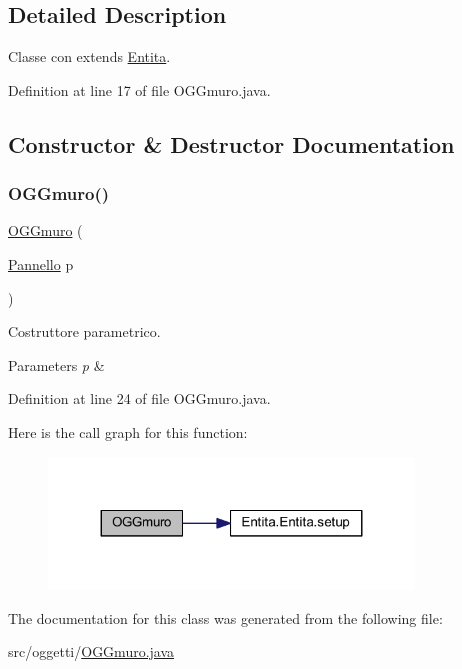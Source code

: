 \subsection{Detailed Description}
Classe con extends \hyperlink{namespace_entita}{Entita}. 

Definition at line 17 of file O\+G\+Gmuro.\+java.



\subsection{Constructor \& Destructor Documentation}
\mbox{\label{classoggetti_1_1_o_g_gmuro_a938d7b2801316b27b70a11b2728f6811}} 
\subsubsection{\texorpdfstring{O\+G\+Gmuro()}{OGGmuro()}}
{\footnotesize\ttfamily \hyperlink{classoggetti_1_1_o_g_gmuro}{O\+G\+Gmuro} (\begin{DoxyParamCaption}\item[{\hyperlink{classa_1_1survival_1_1game_1_1_pannello}{Pannello}}]{p }\end{DoxyParamCaption})}



Costruttore parametrico. 


\begin{DoxyParams}{Parameters}
{\em p} & \\
\hline
\end{DoxyParams}


Definition at line 24 of file O\+G\+Gmuro.\+java.

Here is the call graph for this function\+:
\nopagebreak
\begin{figure}[H]
\begin{center}
\leavevmode
\includegraphics[width=275pt]{classoggetti_1_1_o_g_gmuro_a938d7b2801316b27b70a11b2728f6811_cgraph}
\end{center}
\end{figure}


The documentation for this class was generated from the following file\+:\begin{DoxyCompactItemize}
\item 
src/oggetti/\hyperlink{_o_g_gmuro_8java}{O\+G\+Gmuro.\+java}\end{DoxyCompactItemize}
